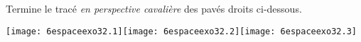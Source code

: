 Termine le tracé {\em en perspective cavalière} des pavés droits ci-dessous.
\par\texttt{[image: 6espaceexo32.1]}\hfill\texttt{[image: 6espaceexo32.2]}\hfill\texttt{[image: 6espaceexo32.3]}